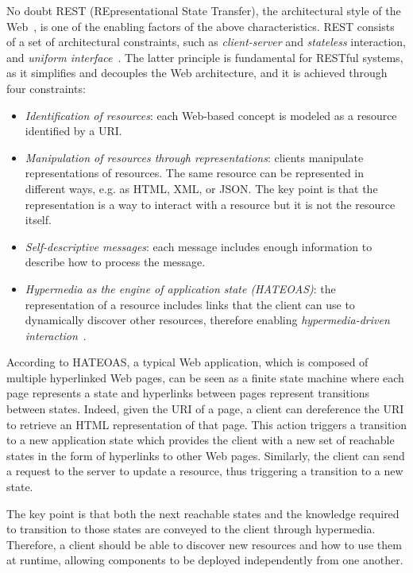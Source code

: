 No doubt REST (REpresentational State Transfer), the architectural style of the Web~\cite{fielding2000}, is one of the enabling factors of the above characteristics.
REST consists of a set of architectural constraints, such as \textit{client-server} and \textit{stateless} interaction, and \textit{uniform interface}~\cite{fielding2002}.
The latter principle is fundamental for RESTful systems, as it simplifies and decouples the Web architecture, and it is achieved through four constraints:
\begin{itemize}
    \item \textit{Identification of resources}: each Web-based concept is modeled as a resource identified by a URI.
    \item \textit{Manipulation of resources through representations}: clients manipulate representations of resources.
    The same resource can be represented in different ways, e.g. as HTML, XML, or JSON.
    The key point is that the representation is a way to interact with a resource but it is not the resource itself.
    \item \textit{Self-descriptive messages}: each message includes enough information to describe how to process the message.
    \item \textit{Hypermedia as the engine of application state (HATEOAS)}: the representation of a resource includes links that the client can use to dynamically discover other resources, therefore enabling \textit{hypermedia-driven interaction}~\cite{Varanasi2015}.
\end{itemize}

According to HATEOAS, a typical Web application, which is composed of multiple hyperlinked Web pages, can be seen as a finite state machine where each page represents a state and hyperlinks between pages represent transitions between states.
Indeed, given the URI of a page, a client can dereference the URI to retrieve an HTML representation of that page.
This action triggers a transition to a new application state which provides the client with a new set of reachable states in the form of hyperlinks to other Web pages.
Similarly, the client can send a request to the server to update a resource, thus triggering a transition to a new state.

The key point is that both the next reachable states and the knowledge required to transition to those states are conveyed to the client through hypermedia.
Therefore, a client should be able to discover new resources and how to use them at runtime, allowing components to be deployed independently from one another.

